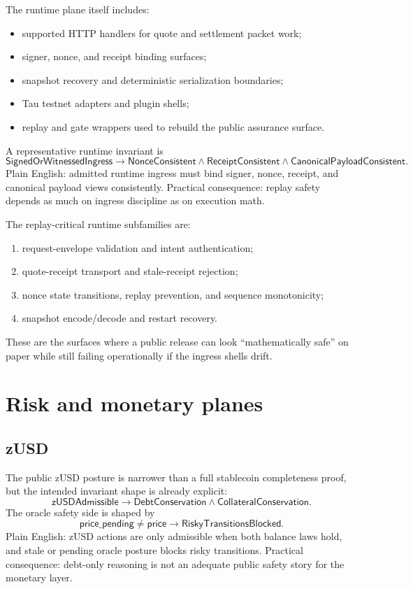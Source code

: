\documentclass[10pt]{extarticle}
\begin{document}
The runtime plane itself includes:
\begin{itemize}
  \item supported HTTP handlers for quote and settlement packet work;
  \item signer, nonce, and receipt binding surfaces;
  \item snapshot recovery and deterministic serialization boundaries;
  \item Tau testnet adapters and plugin shells;
  \item replay and gate wrappers used to rebuild the public assurance surface.
\end{itemize}

A representative runtime invariant is
\[
\mathsf{SignedOrWitnessedIngress} \to \mathsf{NonceConsistent} \wedge \mathsf{ReceiptConsistent} \wedge \mathsf{CanonicalPayloadConsistent}.
\]
Plain English: admitted runtime ingress must bind signer, nonce, receipt,
and canonical payload views consistently.
Practical consequence: replay safety depends as much on ingress discipline as on
execution math.

The replay-critical runtime subfamilies are:
\begin{enumerate}
  \item request-envelope validation and intent authentication;
  \item quote-receipt transport and stale-receipt rejection;
  \item nonce state transitions, replay prevention, and sequence monotonicity;
  \item snapshot encode/decode and restart recovery.
\end{enumerate}
These are the surfaces where a public release can look ``mathematically safe''
on paper while still failing operationally if the ingress shells drift.

\section{Risk and monetary planes}
\subsection{zUSD}
The public zUSD posture is narrower than a full stablecoin completeness proof,
but the intended invariant shape is already explicit:
\[
\mathsf{zUSDAdmissible} \to \mathsf{DebtConservation} \wedge \mathsf{CollateralConservation}.
\]
The oracle safety side is shaped by
\[
\mathsf{price\_pending} \neq \mathsf{price} \to \mathsf{RiskyTransitionsBlocked}.
\]
Plain English: zUSD actions are only admissible when both balance laws hold,
and stale or pending oracle posture blocks risky transitions.
Practical consequence: debt-only reasoning is not an adequate public safety
story for the monetary layer.
\end{document}
